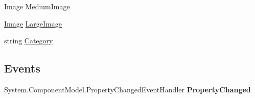 \begin{DoxyCompactItemize}
\begin{DoxyCompactList}\small\item\em \end{DoxyCompactList}\item 
\hypertarget{class_price___comparison_1_1amazon_1_1ecs_1_1_image_set_a56f4f8517ca6ea543aa7d4589f4bccf6}{\hyperlink{class_price___comparison_1_1amazon_1_1ecs_1_1_image}{Image} \hyperlink{class_price___comparison_1_1amazon_1_1ecs_1_1_image_set_a56f4f8517ca6ea543aa7d4589f4bccf6}{Medium\-Image}}\label{class_price___comparison_1_1amazon_1_1ecs_1_1_image_set_a56f4f8517ca6ea543aa7d4589f4bccf6}

\begin{DoxyCompactList}\small\item\em \end{DoxyCompactList}\item 
\hypertarget{class_price___comparison_1_1amazon_1_1ecs_1_1_image_set_a7996e595ebfd53846396dbaed09d9324}{\hyperlink{class_price___comparison_1_1amazon_1_1ecs_1_1_image}{Image} \hyperlink{class_price___comparison_1_1amazon_1_1ecs_1_1_image_set_a7996e595ebfd53846396dbaed09d9324}{Large\-Image}}\label{class_price___comparison_1_1amazon_1_1ecs_1_1_image_set_a7996e595ebfd53846396dbaed09d9324}

\begin{DoxyCompactList}\small\item\em \end{DoxyCompactList}\item 
\hypertarget{class_price___comparison_1_1amazon_1_1ecs_1_1_image_set_a84fbae56066303a986d68c3bb5cb0dbb}{string \hyperlink{class_price___comparison_1_1amazon_1_1ecs_1_1_image_set_a84fbae56066303a986d68c3bb5cb0dbb}{Category}}\label{class_price___comparison_1_1amazon_1_1ecs_1_1_image_set_a84fbae56066303a986d68c3bb5cb0dbb}

\begin{DoxyCompactList}\small\item\em \end{DoxyCompactList}\end{DoxyCompactItemize}
\subsection*{Events}
\begin{DoxyCompactItemize}
\item 
\hypertarget{class_price___comparison_1_1amazon_1_1ecs_1_1_image_set_ace9c7f4752accec62f628d1a78823724}{System.\-Component\-Model.\-Property\-Changed\-Event\-Handler {\bfseries Property\-Changed}}\label{class_price___comparison_1_1amazon_1_1ecs_1_1_image_set_ace9c7f4752accec62f628d1a78823724}

\end{DoxyCompactItemize}

